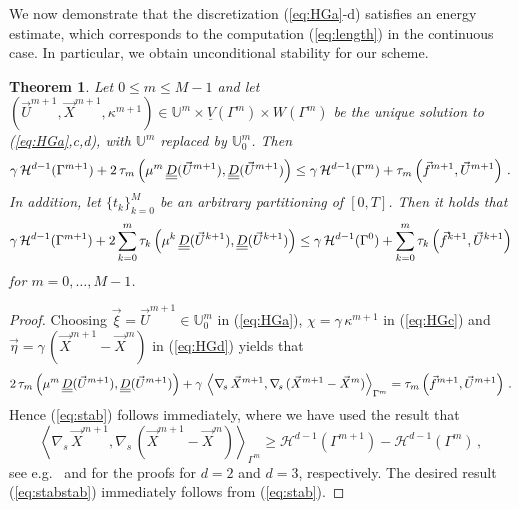 \documentclass[a4paper,12pt,onecolumn]{article}
\newtheorem{thm}{Theorem}
\newcommand{\Vh}{\underline{V}(\Gamma^m)}
\newcommand{\Wh}{W(\Gamma^m)}
\newcommand{\uspace}{\mathbb{U}}
\newcommand{\nabs}{\nabla_{\!s}}
\newcommand{\mat}[1]{\underline{\underline{#1}}\rule{0pt}{0pt}}
\begin{document}
We now demonstrate that the discretization (\ref{eq:HGa}-d) satisfies
an energy estimate, which corresponds to the computation 
(\ref{eq:length}) in the continuous case. In particular, we obtain
unconditional stability for our scheme.

\begin{thm} \label{thm:stabstab}
Let $0\leq m \leq M-1$ and let
$(\vec U^{m+1},\vec{X}^{m+1}, \kappa^{m+1}) 
\in \uspace^m\times \Vh \times \Wh$ 
be the unique solution to {\rm (\ref{eq:HGa},c,d)},
with $\uspace^m$ replaced by $\uspace^m_0$.
Then
\begin{equation}
\gamma\, \mathcal{H}^{d-1}(\Gamma^{m+1})
+ 2\,\tau_m\left(\mu^m\,\mat D(\vec U^{m+1}), \mat D(\vec U^{m+1}) \right)
\leq \gamma\, \mathcal{H}^{d-1}(\Gamma^m) 
+ \tau_m\left( \vec f^{m+1}, \vec U^{m+1} \right)\,.
\label{eq:stab}
\end{equation}
In addition, let $\{t_k\}_{k=0}^M$ be an
arbitrary partitioning of $[0,T]$. Then it holds that
\begin{equation}
\gamma\,\mathcal{H}^{d-1}(\Gamma^{m+1}) 
+ 2 \sum_{k=0}^m  \tau_k\left(\mu^k\,\mat D(\vec U^{k+1}), \mat D(\vec U^{k+1})
\right)\leq \gamma\,\mathcal{H}^{d-1}(\Gamma^0)
+ \sum_{k=0}^m \tau_k\left(\vec f^{k+1}, \vec U^{k+1} \right)
\label{eq:stabstab}
\end{equation}
for $m=0,\ldots, M-1$.
\end{thm}
\begin{proof}
Choosing $\vec\xi = \vec U^{m+1} \in \uspace^m_0$ in (\ref{eq:HGa}), 
$\chi = \gamma\,\kappa^{m+1}$ in (\ref{eq:HGc}) and
$\vec\eta=\gamma\,({\vec{X}^{m+1}-\vec{X}^m})$ in (\ref{eq:HGd}) yields that
\begin{equation*}
2\,\tau_m\left(\mu^m\,\mat D(\vec U^{m+1}), \mat D(\vec U^{m+1}) \right)
+ \gamma\,\left\langle \nabs\,\vec{X}^{m+1}, \nabs\,(\vec{X}^{m+1} - \vec{X}^m) 
\right\rangle_{\Gamma^m}= \tau_m\left(\vec f^{m+1}, \vec U^{m+1} \right)\,.
\end{equation*}
Hence (\ref{eq:stab}) follows immediately, where
we have used the result that
\begin{equation*}
\left\langle \nabs\,\vec{X}^{m+1}, \nabs\,(\vec{X}^{m+1} - \vec{X}^m) 
\right\rangle_{\Gamma^m}
\geq \mathcal{H}^{d-1}(\Gamma^{m+1}) - \mathcal{H}^{d-1}(\Gamma^{m})\,,
\end{equation*}
see e.g.\ \cite[Proof of Theorem~2.3]{triplej} and 
\cite[Proof of Theorem~2.2]{gflows3d} 
for the proofs for $d=2$ and $d=3$, respectively.
The desired result (\ref{eq:stabstab}) immediately follows from 
(\ref{eq:stab}).
\end{proof}
\end{document}
